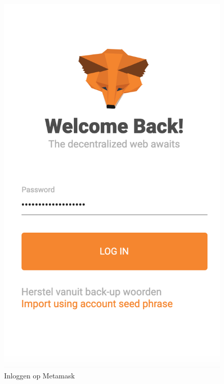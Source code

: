 \begin{figure}
		\includegraphics[width=\linewidth/3]{img/screen_metamask1.png}
		\caption{Inloggen op Metamask }
		\label{fig:screen_login1}
	\end{figure}
